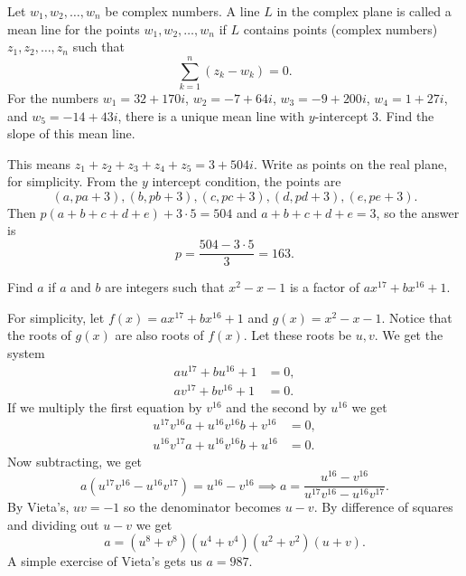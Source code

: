 \begin{question}[name={1988 AIME, \href{https://artofproblemsolving.com/community/c4p458040}{Problem 11}}]
	Let $w_1, w_2, \dots, w_n$ be complex numbers. A line $L$ in the complex plane is called a mean line for the points $w_1, w_2, \dots, w_n$ if $L$ contains points (complex numbers) $z_1, z_2, \dots, z_n$ such that
	\[ \sum_{k = 1}^n (z_k - w_k) = 0. \]
	For the numbers $w_1 = 32 + 170i$, $w_2 = -7 + 64i$, $w_3 = -9 +200i$, $w_4 = 1 + 27i$, and $w_5 = -14 + 43i$, there is a unique mean line with $y$-intercept 3. Find the slope of this mean line.
\end{question}


\begin{solution}[name={Solution by OlympusHero}]
	This means $z_1+z_2+z_3+z_4+z_5=3+504i$. Write as points on the real plane, for simplicity. From the $y$ intercept condition, the points are $$(a,pa+3), (b,pb+3), (c,pc+3), (d,pd+3), (e,pe+3).$$ Then $p(a+b+c+d+e)+3 \cdot 5=504$ and $a+b+c+d+e=3$, so the answer is $$p=\frac{504-3 \cdot 5}{3} = \boxed{163}.$$
\end{solution}






\begin{question}[name={1988 AIME, \href{https://artofproblemsolving.com/community/c4p458060}{Problem 13}}]
	Find $a$ if $a$ and $b$ are integers such that $x^2 - x - 1$ is a factor of $ax^{17} + bx^{16} + 1$.	
\end{question}


\begin{solution}[name={Solution by bobthegod78}]
	For simplicity, let $f(x) =ax^{17} + bx^{16} + 1$ and $g(x) = x^2-x-1$. Notice that the roots of $g(x)$ are also roots of $f(x)$. Let these roots be $u,v$. We get the system\begin{align*} au^{17} + bu^{16} + 1 &= 0, \\ av^{17} + bv^{16} + 1 &= 0. \end{align*}If we multiply the first equation by $v^{16}$ and the second by $u^{16}$ we get\begin{align*} u^{17} v^{16} a + u^{16} v^{16} b + v^{16} &= 0, \\ u^{16} v^{17} a + u^{16} v^{16} b + u^{16} &= 0. \end{align*}Now subtracting, we get\[a(u^{17}v^{16} -u^{16} v^{17}) = u^{16}-v^{16} \implies a = \frac{u^{16} - v^{16}}{u^{17}v^{16} -u^{16} v^{17}}.\]By Vieta's, $uv=-1$ so the denominator becomes $u-v$. By difference of squares and dividing out $u-v$ we get\[a= (u^8+v^8)(u^4+v^4)(u^2+v^2)(u+v).\]A simple exercise of Vieta's gets us $a= \boxed{987}.$
\end{solution}





